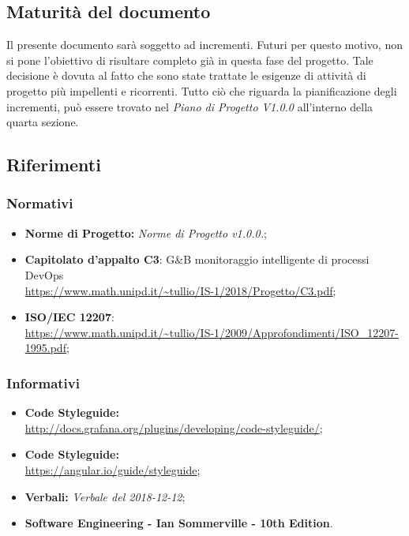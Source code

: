 \subsection{Maturità del documento}
Il presente documento sarà soggetto ad incrementi. Futuri per questo motivo, non si pone l'obiettivo di risultare completo già in questa fase del progetto.
Tale decisione è dovuta al fatto che sono state trattate le esigenze di attività di progetto più impellenti e ricorrenti.
Tutto ciò che riguarda la pianificazione degli incrementi, può essere trovato nel \emph{Piano di Progetto V1.0.0} all'interno della quarta sezione.  
\subsection{Riferimenti}

\subsubsection{Normativi}
\begin{itemize}
	\item \textbf{Norme di Progetto:} \emph{Norme di Progetto v1.0.0.};
	\item \textbf{Capitolato d'appalto C3}: G\&B monitoraggio intelligente di processi DevOps \\
	\url{https://www.math.unipd.it/~tullio/IS-1/2018/Progetto/C3.pdf};
	\item \textbf{ISO/IEC 12207}:\\ \url{https://www.math.unipd.it/~tullio/IS-1/2009/Approfondimenti/ISO_12207-1995.pdf};
\end{itemize}
\subsubsection{Informativi}
\begin{itemize}
	\item \textbf{ Code Styleguide:} \\
	\url{http://docs.grafana.org/plugins/developing/code-styleguide/};
	\item \textbf{ Code Styleguide:} \\
	\url{https://angular.io/guide/styleguide};
	\item \textbf{Verbali:} \emph{Verbale del 2018-12-12};
	\item \textbf{Software Engineering - Ian Sommerville - 10th Edition}.
\end{itemize}
\pagebreak